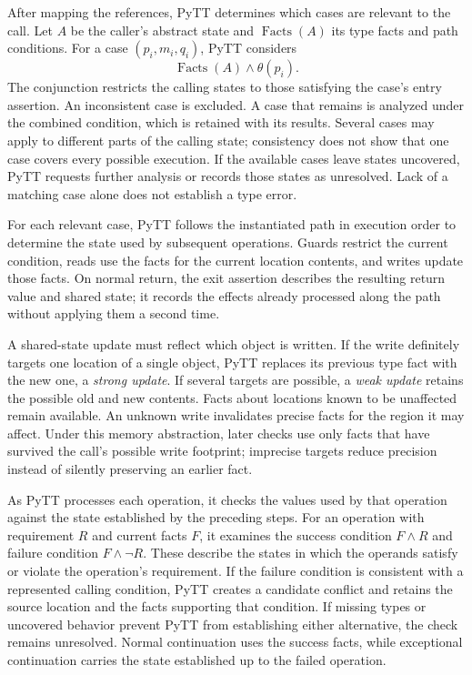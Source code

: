After mapping the references, PyTT determines which cases are relevant
to the call. Let $A$ be the caller's abstract state and
$\operatorname{Facts}(A)$ its type facts and path conditions. For a case
$(p_i,m_i,q_i)$, PyTT considers
\begin{equation}
    \operatorname{Facts}(A)\land\theta(p_i).
    \label{eq:applicability}
\end{equation}
The conjunction restricts the calling states to those satisfying the
case's entry assertion. An inconsistent case is excluded. A case that
remains is analyzed under the combined condition, which is retained
with its results. Several cases may apply to different parts of the
calling state; consistency does not show that one case covers every
possible execution. If the available cases leave states uncovered, PyTT
requests further analysis or records those states as unresolved. Lack
of a matching case alone does not establish a type error.

For each relevant case, PyTT follows the instantiated path in execution
order to determine the state used by subsequent operations. Guards
restrict the current condition, reads use the facts for the current
location contents, and writes update those facts. On normal return,
the exit assertion describes the resulting return value and shared
state; it records the effects already processed along the path without
applying them a second time.

A shared-state update must reflect which object is written. If the
write definitely targets one location of a single object, PyTT replaces
its previous type fact with the new one, a \emph{strong update}. If
several targets are possible, a \emph{weak update} retains the possible
old and new contents. Facts about locations known to be unaffected
remain available. An unknown write invalidates precise facts for the
region it may affect. Under this memory abstraction, later checks use
only facts that have survived the call's possible write footprint;
imprecise targets reduce precision instead of silently preserving an
earlier fact.

As PyTT processes each operation, it checks the values used by that
operation against the state established by the preceding steps. For an
operation with requirement $R$ and current facts $F$, it examines the
success condition $F\land R$
and failure condition $F\land\neg R$. These describe the states in which
the operands satisfy or violate the operation's requirement. If the
failure condition is consistent with a represented calling condition,
PyTT creates a candidate conflict and retains the source location and the
facts supporting that condition. If missing types or uncovered behavior
prevent PyTT from establishing either alternative, the check remains
unresolved. Normal continuation uses the success facts, while exceptional
continuation carries the state established up to the failed operation.

